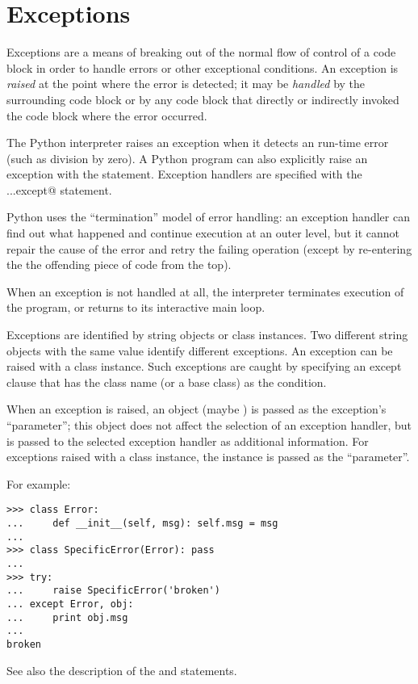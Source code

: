 \section{Exceptions}

Exceptions are a means of breaking out of the normal flow of control
of a code block in order to handle errors or other exceptional
conditions.  An exception is {\em raised} at the point where the error
is detected; it may be {\em handled} by the surrounding code block or
by any code block that directly or indirectly invoked the code block
where the error occurred.

The Python interpreter raises an exception when it detects an run-time
error (such as division by zero).  A Python program can also
explicitly raise an exception with the \verb@raise@ statement.
Exception handlers are specified with the \verb@try...except@
statement.

Python uses the ``termination'' model of error handling: an exception
handler can find out what happened and continue execution at an outer
level, but it cannot repair the cause of the error and retry the
failing operation (except by re-entering the the offending piece of
code from the top).

When an exception is not handled at all, the interpreter terminates
execution of the program, or returns to its interactive main loop.

Exceptions are identified by string objects or class instances.  Two
different string objects with the same value identify different
exceptions.  An exception can be raised with a class instance.  Such
exceptions are caught by specifying an except clause that has the
class name (or a base class) as the condition.

When an exception is raised, an object (maybe \verb@None@) is passed
as the exception's ``parameter''; this object does not affect the
selection of an exception handler, but is passed to the selected
exception handler as additional information.  For exceptions raised
with a class instance, the instance is passed as the ``parameter''.

For example:

\begin{verbatim}
>>> class Error:
...     def __init__(self, msg): self.msg = msg
... 
>>> class SpecificError(Error): pass
... 
>>> try:
...     raise SpecificError('broken')
... except Error, obj:
...     print obj.msg
... 
broken
\end{verbatim}

See also the description of the \verb@try@ and \verb@raise@
statements.
